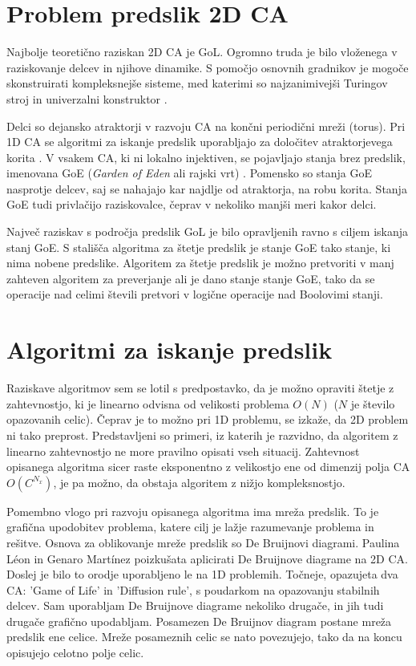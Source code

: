 \documentclass[12pt,a4paper,openany,twoside]{book}
\begin{document}
\section{Problem predslik 2D CA}

Najbolje teoretično raziskan 2D CA je GoL.
Ogromno truda je bilo vloženega v raziskovanje delcev in njihove dinamike. S pomočjo
osnovnih gradnikov je mogoče skonstruirati kompleksnejše sisteme, med katerimi so
najzanimivejši Turingov stroj \cite{Rendell2001} in univerzalni konstruktor \cite{Greene2013}.

Delci so dejansko atraktorji v razvoju CA na končni periodični mreži (torus).
Pri 1D CA se algoritmi za iskanje predslik uporabljajo za določitev atraktorjevega korita \cite{Wuensche1992}.
V vsakem CA, ki ni lokalno injektiven, se pojavljajo stanja brez predslik, imenovana GoE
(\textit{Garden of Eden} ali rajski vrt) \cite{Moore1962, Myhill1963}.
Pomensko so stanja GoE nasprotje delcev, saj se nahajajo kar
najdlje od atraktorja, na robu korita. Stanja GoE tudi privlačijo raziskovalce,
čeprav v nekoliko manjši meri kakor delci.

Največ raziskav s področja predslik GoL je bilo opravljenih ravno s ciljem iskanja stanj GoE.
S stališča algoritma za štetje predslik je stanje GoE tako stanje, ki nima nobene predslike.
Algoritem za štetje predslik je možno pretvoriti v manj zahteven algoritem za preverjanje ali je dano stanje stanje GoE,
tako da se operacije nad celimi števili pretvori v logične operacije nad Boolovimi stanji.

\section{Algoritmi za iskanje predslik}

Raziskave algoritmov sem se lotil s predpostavko, da je možno opraviti štetje z zahtevnostjo,
ki je linearno odvisna od velikosti problema \( O(N) \)  (\(N\) je število opazovanih celic).
Čeprav je to možno pri 1D problemu, se izkaže, da 2D problem ni tako preprost.
Predstavljeni so primeri, iz katerih je razvidno,
da algoritem z linearno zahtevnostjo ne more pravilno opisati vseh situacij.
Zahtevnost opisanega algoritma sicer raste eksponentno z velikostjo ene
od dimenzij polja CA \( O(C^{N_x}) \), je pa možno, da obstaja algoritem z nižjo kompleksnostjo.

Pomembno vlogo pri razvoju opisanega algoritma ima mreža predslik.
To je grafična upodobitev problema, katere cilj je lažje razumevanje problema in rešitve.
Osnova za oblikovanje mreže predslik so De Bruijnovi diagrami.
Paulina Léon in Genaro Martínez \cite{PaulinaGenaro2016}
poizkušata aplicirati De Bruijnove diagrame na 2D CA.
Doslej je bilo to orodje uporabljeno le na 1D problemih.
Točneje, opazujeta dva CA: 'Game of Life' in 'Diffusion rule',
s poudarkom na opazovanju stabilnih delcev.
Sam uporabljam De Bruijnove diagrame nekoliko drugače,
in jih tudi drugače grafično upodabljam.
Posamezen De Bruijnov diagram postane mreža predslik ene celice.
Mreže posameznih celic se nato povezujejo,
tako da na koncu opisujejo celotno polje celic.
\end{document}
